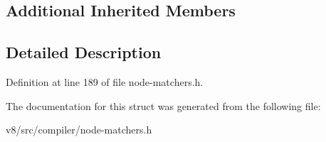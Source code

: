 \subsection*{Additional Inherited Members}


\subsection{Detailed Description}


Definition at line 189 of file node-\/matchers.\+h.



The documentation for this struct was generated from the following file\+:\begin{DoxyCompactItemize}
\item 
v8/src/compiler/node-\/matchers.\+h\end{DoxyCompactItemize}
